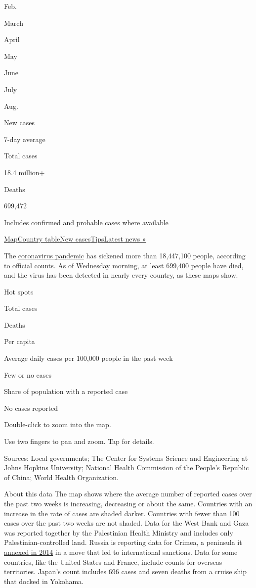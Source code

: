 Feb.

March

April

May

June

July

Aug.

New cases

7-day average

Total cases

18.4 million+

Deaths

699,472

Includes confirmed and probable cases where available

\protect\hyperlink{map}{Map}\protect\hyperlink{countries}{Country
table}\protect\hyperlink{cases}{New
cases}\protect\hyperlink{tips}{Tips}\href{https://www.nytimes3xbfgragh.onion/2020/08/04/world/coronavirus-covid-19.html}{Latest
news »}

The
\href{https://www.nytimes3xbfgragh.onion/article/prepare-for-coronavirus.html}{coronavirus
pandemic} has sickened more than 18,447,100 people, according to
official counts. As of Wednesday morning, at least 699,400 people have
died, and the virus has been detected in nearly every country, as these
maps show.

Hot spots

Total cases

Deaths

Per capita

Average daily cases per 100,000 people in the past week

Few or no cases

Share of population with a reported case

No cases reported

Double-click to zoom into the map.

Use two fingers to pan and zoom. Tap for details.

Sources: Local governments; The Center for Systems Science and
Engineering at Johns Hopkins University; National Health Commission of
the People's Republic of China; World Health Organization.

About this data The map shows where the average number of reported cases
over the past two weeks is increasing, decreasing or about the same.
Countries with an increase in the rate of cases are shaded darker.
Countries with fewer than 100 cases over the past two weeks are not
shaded. Data for the West Bank and Gaza was reported together by the
Palestinian Health Ministry and includes only Palestinian-controlled
land. Russia is reporting data for Crimea, a peninsula it
\href{https://www.nytimes3xbfgragh.onion/2014/03/19/world/europe/ukraine.html}{annexed
in 2014} in a move that led to international sanctions. Data for some
countries, like the United States and France, include counts for
overseas territories. Japan's count includes 696 cases and seven deaths
from a cruise ship that docked in Yokohama.

